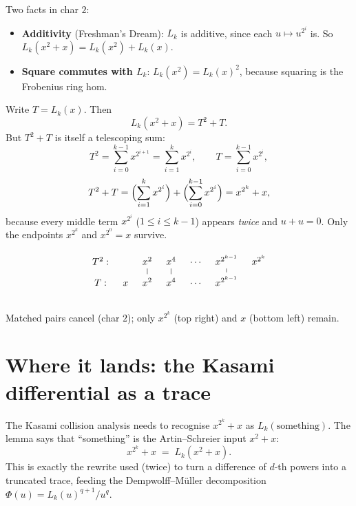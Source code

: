 \documentclass[11pt]{article}
\begin{document}
\noindent
Two facts in char $2$:
\begin{itemize}\itemsep4pt
  \item \textbf{Additivity} (Freshman's Dream): $L_k$ is additive, since each
        $u\mapsto u^{2^i}$ is. So $L_k(x^2+x)=L_k(x^2)+L_k(x)$.
  \item \textbf{Square commutes with $L_k$}: $L_k(x^2)=L_k(x)^2$, because
        squaring is the Frobenius ring hom.
\end{itemize}
Write $T=L_k(x)$. Then
\[
L_k(x^2+x)=T^2+T .
\]
But $T^2+T$ is itself a telescoping sum:
\[
T^2 = \sum_{i=0}^{k-1} x^{2^{i+1}} = \sum_{i=1}^{k} x^{2^i},
\qquad
T = \sum_{i=0}^{k-1} x^{2^i},
\]
\[
T^2+T = \Bigl(\sum_{i=1}^{k} x^{2^i}\Bigr)+\Bigl(\sum_{i=0}^{k-1} x^{2^i}\Bigr)
= x^{2^k}+x,
\]
because every middle term $x^{2^i}$ ($1\le i\le k-1$) appears \emph{twice} and
$u+u=0$. Only the endpoints $x^{2^k}$ and $x^{2^0}=x$ survive.

\[
\begin{tikzcd}[column sep=tiny, row sep=tiny]
T^2: & & x^{2} & x^{4} & \cdots & x^{2^{k-1}} & x^{2^k} \\
T:   & x & x^{2} & x^{4} & \cdots & x^{2^{k-1}} & \\
\arrow[from=1-3, to=2-3, dash] \arrow[from=1-4, to=2-4, dash]
\arrow[from=1-6, to=2-6, dash]
\end{tikzcd}
\]
\begin{center}\small Matched pairs cancel (char $2$); only $x^{2^k}$ (top right)
and $x$ (bottom left) remain.\end{center}


\bigskip

\section{Where it lands: the Kasami differential as a trace}

\noindent
The Kasami collision analysis needs to recognise $x^{2^k}+x$ as
$L_k(\text{something})$. The lemma says that ``something'' is the
Artin--Schreier input $x^2+x$:
\[
x^{2^k}+x \;=\; L_k(x^2+x).
\]
This is exactly the rewrite used (twice) to turn a difference of $d$-th powers
into a truncated trace, feeding the Dempwolff--M\"uller decomposition
$\Phi(u)=L_k(u)^{q+1}/u^{q}$.
\end{document}
